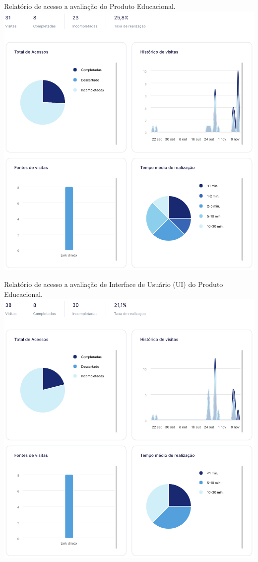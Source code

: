 \begin{anexosenv}
\newpage
\begin{center}
    Relatório de acesso a avaliação do Produto Educacional.
    \newline
    \newline
    \includegraphics[width=\textwidth]{pos-textuais/anexo_pe.png}
\end{center}

\newpage
\begin{center}
    Relatório de acesso a avaliação de Interface de Usuário (UI) do Produto Educacional.
    \newline
    \newline
    \includegraphics[width=\textwidth]{pos-textuais/anexo_ui.png}
\end{center}



\end{anexosenv}
